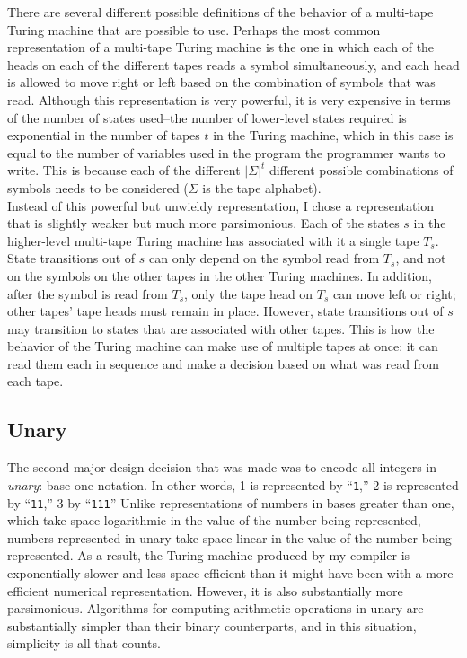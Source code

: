 \documentclass{report}
\begin{document}
There are several different possible definitions of the behavior of a multi-tape Turing machine that are possible to use. Perhaps the most common representation of a multi-tape Turing machine is the one in which each of the heads on each of the different tapes reads a symbol simultaneously, and each head is allowed to move right or left based on the combination of symbols that was read. Although this representation is very powerful, it is very expensive in terms of the number of states used--the number of lower-level states required is exponential in the number of tapes $t$ in the Turing machine, which in this case is equal to the number of variables used in the program the programmer wants to write. This is because each of the different $|\Sigma|^t$ different possible combinations of symbols needs to be considered ($\Sigma$ is the tape alphabet). \\

Instead of this powerful but unwieldy representation, I chose a representation that is slightly weaker but much more parsimonious. Each of the states $s$ in the higher-level multi-tape Turing machine has associated with it a single tape $T_s$. State transitions out of $s$ can only depend on the symbol read from $T_s$, and not on the symbols on the other tapes in the other Turing machines. In addition, after the symbol is read from $T_s$, only the tape head on $T_s$ can move left or right; other tapes' tape heads must remain in place. However, state transitions out of $s$ may transition to states that are associated with other tapes. This is how the behavior of the Turing machine can make use of multiple tapes at once: it can read them each in sequence and make a decision based on what was read from each tape. \\

\subsection{Unary}

The second major design decision that was made was to encode all integers in \emph{unary}: base-one notation. In other words, 1 is represented by ``\texttt{1},'' 2 is represented by ``\texttt{11},'' 3 by ``\texttt{111}'' Unlike representations of numbers in bases greater than one, which take space logarithmic in the value of the number being represented, numbers represented in unary take space linear in the value of the number being represented. As a result, the Turing machine produced by my compiler is exponentially slower and less space-efficient than it might have been with a more efficient numerical representation. However, it is also substantially more parsimonious. Algorithms for computing arithmetic operations in unary are substantially simpler than their binary counterparts, and in this situation, simplicity is all that counts. \\
\end{document}
